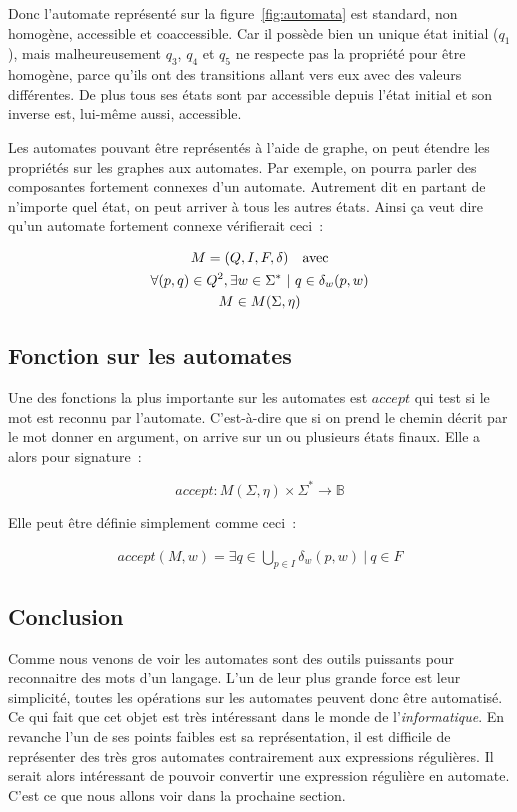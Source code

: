 Donc l'automate représenté sur la figure~\ref{fig:automata} est standard, non
homogène, accessible et coaccessible. Car il possède bien un unique état
initial (\(q_1\)), mais malheureusement \(q_3\), \(q_4\) et \(q_5\) ne respecte
pas la propriété pour être homogène, parce qu'ils ont des transitions allant
vers eux avec des valeurs différentes. De plus tous ses états sont par
accessible depuis l'état initial et son inverse est, lui-même aussi,
accessible.

\vphantom{}

Les automates pouvant être représentés à l'aide de graphe, on peut étendre les
propriétés sur les graphes aux automates. Par exemple, on pourra parler des
composantes fortement connexes d'un automate. Autrement dit en partant de
n'importe quel état, on peut arriver à tous les autres états. Ainsi ça veut
dire qu'un automate fortement connexe vérifierait ceci~:

\begin{gather}
    M = (Q, I, F, \delta) \quad \text{avec} \\
    \forall (p, q) \in Q^2, \exists w \in \Sigma^* ~|~ q \in \delta_w(p, w) \notag \\
    M \in M(\Sigma, \eta) \notag
\end{gather}

\subsection{Fonction sur les automates}

Une des fonctions la plus importante sur les automates est \(accept\) qui test
si le mot est reconnu par l'automate. C'est-à-dire que si on prend le chemin
décrit par le mot donner en argument, on arrive sur un ou plusieurs états
finaux. Elle a alors pour signature~:

\[
    accept: M(\Sigma, \eta) \times \Sigma^* \to \mathbb{B}
\]

Elle peut être définie simplement comme ceci~:

\begin{align}
    accept(M, w) = \exists q \in \bigcup_{p \in I} \delta_w(p, w) ~|~ q \in F
\end{align}

\subsection{Conclusion}

Comme nous venons de voir les automates sont des outils puissants pour
reconnaitre des mots d'un langage. L'un de leur plus grande force est leur
simplicité, toutes les opérations sur les automates peuvent donc être
automatisé. Ce qui fait que cet objet est très intéressant dans le monde de
l'\textit{informatique}. En revanche l'un de ses points faibles est sa
représentation, il est difficile de représenter des très gros automates
contrairement aux expressions régulières. Il serait alors intéressant de
pouvoir convertir une expression régulière en automate. C'est ce que nous
allons voir dans la prochaine section.